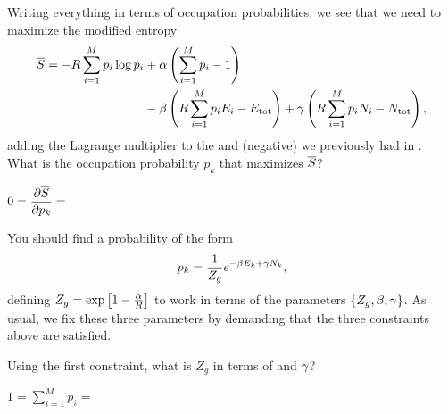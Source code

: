 Writing everything in terms of occupation probabilities, we see that we need to maximize the modified entropy
\begin{align*}
  \overline S = -R \sum_{i = 1}^M p_i \log p_i & + \alpha\left(\sum_{i = 1}^M p_i - 1\right) \\
                                         & - \beta\left(R \sum_{i = 1}^M p_i E_i - E_{\text{tot}}\right) + \gamma\left(R \sum_{i = 1}^M p_i N_i - N_{\text{tot}}\right),
\end{align*}
adding the Lagrange multiplier \ga to the \al and (negative) \be we previously had in .
What is the occupation probability $p_k$ that maximizes $\overline S$?
\begin{mdframed}
  $\displaystyle 0 = \frac{\partial \overline S}{\partial p_k} = $ \\[140 pt]
\end{mdframed}

You should find a probability of the form
\begin{equation}
  \label{eq:grand_Lagrange}
  p_k = \frac{1}{Z_g} e^{-\beta E_k + \gamma N_k},
\end{equation}
defining $Z_g = \exp\left[1 - \frac{\alpha}{R}\right]$ to work in terms of the parameters $\left\{Z_g, \beta, \gamma\right\}$.
As usual, we fix these three parameters by demanding that the three constraints above are satisfied.

\newpage %
Using the first constraint, what is $Z_g$ in terms of \be and $\gamma$?
\begin{mdframed}
  $\displaystyle 1 = \sum_{i = 1}^M p_i = $ \\[50 pt]
\end{mdframed}

